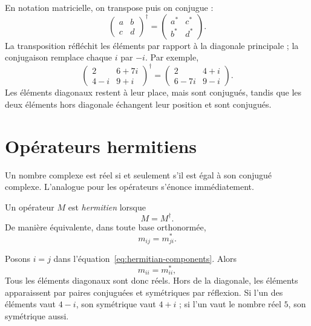 En notation matricielle, on transpose puis on conjugue :
\begin{equation}
\begin{pmatrix}
a&b\\
c&d
\end{pmatrix}^{\!\dagger}
=
\begin{pmatrix}
a^*&c^*\\
b^*&d^*
\end{pmatrix}.
\label{eq:dagger-two-by-two}
\end{equation}
La transposition réfléchit les éléments par rapport à la diagonale principale ; la conjugaison remplace chaque \(i\) par \(-i\). Par exemple,
\begin{equation}
\begin{pmatrix}
2&6+7i\\
4-i&9+i
\end{pmatrix}^{\!\dagger}
=
\begin{pmatrix}
2&4+i\\
6-7i&9-i
\end{pmatrix}.
\label{eq:dagger-numerical-example}
\end{equation}
Les éléments diagonaux restent à leur place, mais sont conjugués, tandis que les deux éléments hors diagonale échangent leur position et sont conjugués.

\section{Opérateurs hermitiens}

Un nombre complexe est réel si et seulement s’il est égal à son conjugué complexe. L’analogue pour les opérateurs s’énonce immédiatement.

\begin{definition}Un opérateur \(M\) est \emph{hermitien} lorsque
\begin{equation}
M=M^\dagger.
\label{eq:hermitian-definition}
\end{equation}
De manière équivalente, dans toute base orthonormée,
\begin{equation}
m_{ij}=m_{ji}^*.
\label{eq:hermitian-components}
\end{equation}\end{definition}

Posons \(i=j\) dans l’équation~\eqref{eq:hermitian-components}. Alors
\[
m_{ii}=m_{ii}^*,
\]
Tous les éléments diagonaux sont donc réels. Hors de la diagonale, les éléments apparaissent par paires conjuguées et symétriques par réflexion. Si l’un des éléments vaut \(4-i\), son symétrique vaut \(4+i\) ; si l’un vaut le nombre réel \(5\), son symétrique aussi.

